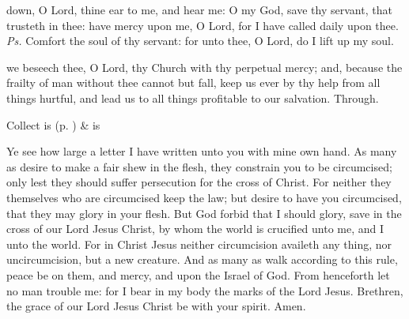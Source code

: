 
\introit
{} down, O Lord, thine ear to me, and hear me: O my God, save thy servant, that trusteth in thee: have mercy upon me, O Lord, for I have called daily upon thee. \textit{Ps.} Comfort the soul of thy servant: for unto thee, O Lord, do I lift up my soul.

\collect
{} we beseech thee, O Lord, thy Church with thy perpetual mercy; and, because the frailty of man without thee cannot but fall, keep us ever by thy help from all things hurtful, and lead us to all things profitable to our salvation. Through.
\begin{rubric}
     Collect is  (p. \pageref{SPSaints}) \&  is 
\end{rubric}

 Ye see how large a letter I have written unto you with mine own hand. As many as desire to make a fair shew in the flesh, they constrain you to be circumcised; only lest they should suffer persecution for the cross of Christ. For neither they themselves who are circumcised keep the law; but desire to have you circumcised, that they may glory in your flesh. But God forbid that I should glory, save in the cross of our Lord Jesus Christ, by whom the world is crucified unto me, and I unto the world. For in Christ Jesus neither circumcision availeth any thing, nor uncircumcision, but a new creature. And as many as walk according to this rule, peace be on them, and mercy, and upon the Israel of God. From henceforth let no man trouble me: for I bear in my body the marks of the Lord Jesus. Brethren, the grace of our Lord Jesus Christ be with your spirit. Amen.


